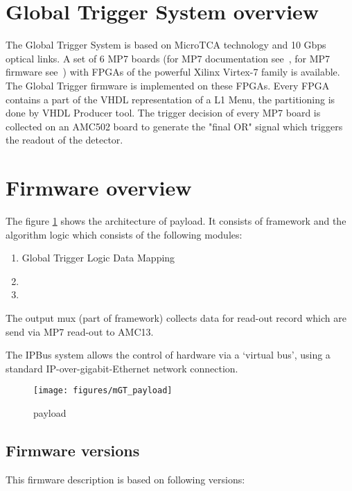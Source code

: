 \section{Global Trigger System overview}\label{sec:fw:gt_system}

The Global Trigger System is based on MicroTCA technology and 10 Gbps optical links. A set of 6 MP7 boards (for MP7 documentation see~\cite{MP7}, for MP7 firmware see~\cite{MP7 firmware}) with FPGAs of the powerful Xilinx Virtex-7 family is available. The Global Trigger firmware is implemented on these FPGAs. Every FPGA contains a part of the VHDL representation of a L1 Menu, the partitioning is done by VHDL Producer tool. The trigger decision of every MP7 board is collected on an AMC502 board to generate the "final OR" signal which triggers the readout of the detector.

\section{Firmware overview}\label{sec:fw:fw}
The figure \ref{fig:mgt} shows the architecture of \ugt payload. It consists of framework and the algorithm logic which consists of the following modules:
\begin{enumerate}
\item Global Trigger Logic Data Mapping
\item \ugtl
\item \ufdl
\end{enumerate}

The output mux (part of framework) collects data for read-out record which are send via MP7 read-out to AMC13.

The IPBus system allows the control of hardware via a ‘virtual bus’, using a standard IP-over-gigabit-Ethernet network connection.
\begin{figure}[h!]
   \centering
    \texttt{[image: figures/mGT\_payload]}
    \caption{\ugt payload}\label{fig:mgt}
 \end{figure}

\subsection{Firmware versions}\label{sec:fw:fw_version}

This firmware description is based on following versions:

